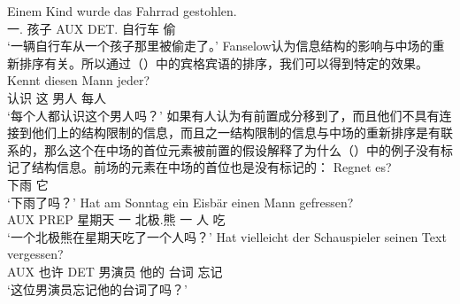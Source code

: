 \ex
\gll Einem Kind wurde das Fahrrad gestohlen.\\
     一.\dat{} 孩子 AUX DET.\nom{} 自行车 偷\\
\glt `一辆自行车从一个孩子那里被偷走了。'
\zl
Fanselow认为信息结构的影响与中场的重新排序有关。所以通过（）中的宾格宾语的排序，我们可以得到特定的效果。
\ea
\gll Kennt diesen Mann jeder?\\
     认识 这 男人 每人\\
\glt `每个人都认识这个男人吗？'
\z
如果有人认为有前置成分移到了\vf ，而且他们不具有连接到他们上的结构限制的信息，而且之一结构限制的信息与中场的重新排序是有联系的，那么这个在中场的首位元素被前置的假设解释了为什么（）中的例子没有标记了结构信息。前场的元素在中场的首位也是没有标记的：
\eal
\ex
\gll Regnet es?\\
     下雨 它\\
\glt `下雨了吗？'
\ex 
\gll Hat am Sonntag ein Eisbär einen Mann gefressen?\\
     AUX PREP 星期天  一   北极.熊 一 人 吃\\
\glt `一个北极熊在星期天吃了一个人吗？'
\ex 
\gll Hat vielleicht der Schauspieler seinen Text vergessen?\\
     AUX 也许    DET 男演员 他的 台词 忘记\\
\glt `这位男演员忘记他的台词了吗？'
